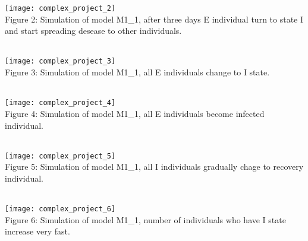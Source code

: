 \documentclass{article}
\begin{document}
\texttt{[image: complex\_project\_2]}
\\
\caption{Figure 2: Simulation of model M1\_1, after three days E individual turn to state I and start spreading desease to other individuals.}
\\
\texttt{[image: complex\_project\_3]}
\\
\caption{Figure 3: Simulation of model M1\_1, all E individuals change to I state.}
\\
\texttt{[image: complex\_project\_4]}
\\
\caption{Figure 4: Simulation of model M1\_1, all E individuals become infected individual.}
\\
\texttt{[image: complex\_project\_5]}
\\
\caption{Figure 5: Simulation of model M1\_1, all I individuals gradually chage to recovery individual.}
\\
\texttt{[image: complex\_project\_6]}
\\
\caption{Figure 6: Simulation of model M1\_1, number of individuals who have I state increase very fast.}
\end{document}
